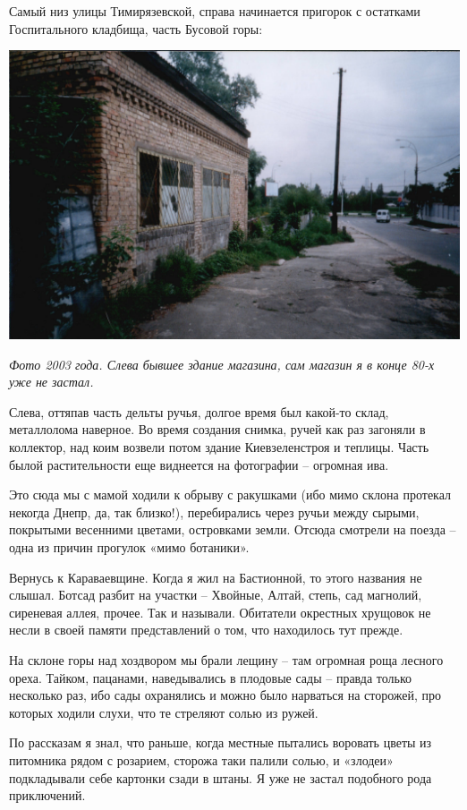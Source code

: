 Самый низ улицы Тимирязевской, справа начинается пригорок с остатками Госпитального кладбища, часть Бусовой горы:

\begin{center}
\includegraphics[width=\linewidth]{chast-vosp/zver/out0012.jpg}

\textit{Фото 2003 года. Слева бывшее здание магазина, сам магазин я в конце 80-х уже не застал.}
\end{center}

Слева, оттяпав часть дельты ручья, долгое время был какой-то склад, металлолома наверное. Во время создания снимка, ручей как раз загоняли в коллектор, над коим возвели потом здание Киевзеленстроя и теплицы. Часть былой растительности еще виднеется на фотографии – огромная ива.

Это сюда мы с мамой ходили к обрыву с ракушками (ибо мимо склона протекал некогда Днепр, да, так близко!), перебирались через ручьи между сырыми, покрытыми весенними цветами, островками земли. Отсюда смотрели на поезда – одна из причин прогулок «мимо ботаники».

Вернусь к Караваевщине. Когда я жил на Бастионной, то этого названия не слышал. Ботсад разбит на участки – Хвойные, Алтай, степь, сад магнолий, сиреневая аллея, прочее. Так и называли. Обитатели окрестных хрущовок не несли в своей памяти представлений о том, что находилось тут прежде.

На склоне горы над хоздвором мы брали лещину – там огромная роща лесного ореха. Тайком, пацанами, наведывались в плодовые сады – правда только несколько раз, ибо сады охранялись и можно было нарваться на сторожей, про которых ходили слухи, что те стреляют солью из ружей.

По рассказам я знал, что раньше, когда местные пытались воровать цветы из питомника рядом с розарием, сторожа таки палили солью, и «злодеи» подкладывали себе картонки сзади в штаны. Я уже не застал подобного рода приключений.

